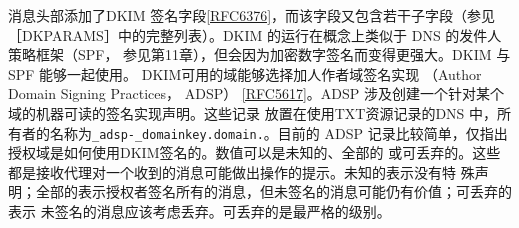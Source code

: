 消息头部添加了DKIM 签名字段\href{https://www.rfc-editor.org/rfc/rfc6376}{[RFC6376]}，而该字段又包含若干子字段（参见
［DKPARAMS］中的完整列表）。DKIM 的运行在概念上类似于 DNS 的发件人策略框架（SPF，
参见第11章），但会因为加密数字签名而变得更强大。DKIM 与 SPF 能够一起使用。
DKIM可用的域能够选择加人作者域签名实现 （Author Domain Signing Practices，
ADSP） \href{https://www.rfc-editor.org/rfc/rfc5617}{[RFC5617]}。ADSP 涉及创建一个针对某个域的机器可读的签名实现声明。这些记录
放置在使用TXT资源记录的DNS 中，所有者的名称为\verb|_adsp-_domainkey.domain.|。目前的
ADSP 记录比较简单，仅指出授权域是如何使用DKIM签名的。数值可以是未知的、全部的
或可丢弃的。这些都是接收代理对一个收到的消息可能做出操作的提示。未知的表示没有特
殊声明；全部的表示授权者签名所有的消息，但未签名的消息可能仍有价值；可丢弃的表示
未签名的消息应该考虑丢弃。可丢弃的是最严格的级别。

